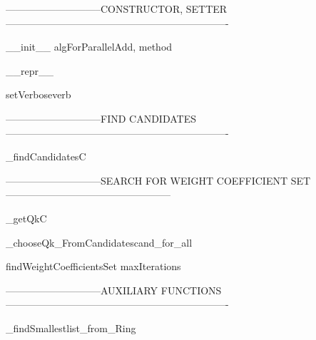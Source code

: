 -----------------------------CONSTRUCTOR, SETTER-------------------------------------------------------------------

\begin{method}{\_\_init\_\_}{ algForParallelAdd, method}

\end{method}


\begin{method}{\_\_repr\_\_}{}

\end{method}


\begin{method}{setVerbose}{verb}

\end{method}


-----------------------------FIND CANDIDATES-------------------------------------------------------------------

\begin{method}{\_findCandidates}{C}

\end{method}


-----------------------------SEARCH FOR WEIGHT COEFFICIENT SET--------------------------------------------------

\begin{method}{\_getQk}{C}

\end{method}


\begin{method}{\_chooseQk\_FromCandidates}{cand\_for\_all}

\end{method}


\begin{method}{findWeightCoefficientsSet}{ maxIterations}

\end{method}


-----------------------------AUXILIARY FUNCTIONS-------------------------------------------------------------------




\begin{method}{\_findSmallest}{list\_from\_Ring}

\end{method}

